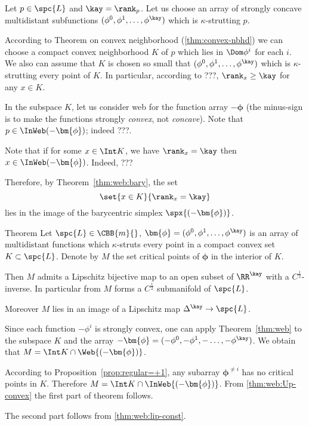 Let $p\in\spc{L}$ and $\kay=\rank_p$.
Let us choose an array of strongly concave multidistant subfunctions $(\phi^0,\phi^1,\dots,\phi^\kay)$ which is $\kappa$-strutting $p$.

According to Theorem on convex neighborhood (\ref{thm:convex-nbhd}) we can choose a compact convex neighborhood $K$ of $p$
which lies in $\Dom\phi^i$ for each $i$.
We also can assume that $K$ is chosen so small that $(\phi^0,\phi^1,\dots,\phi^\kay)$ which is $\kappa$-strutting every point of $K$.
In particular, according to ???, $\rank_x\ge \kay$ for any $x\in K$. 

In the subspace $K$, 
let us consider web for the function array
$-\bm{\phi}$ (the minus-sign is to make the functions strongly \emph{convex}, not \emph{concave}).
Note that $p\in\InWeb(-\bm{\phi})$;
indeed ???.

Note that if for some $x\in\Int K$, 
we have $\rank_x=\kay$ 
then $x\in\InWeb (-\bm{\phi})$.
Indeed, ???

Therefore, by Theorem~\ref{thm:web:bary},
the set 
$$\set{x\in K}{\rank_x=\kay}$$
lies in the image of the barycentric simplex $\spx{(-\bm{\phi})}$.

\begin{thm}{Theorem}
Let $\spc{L}\in\CBB{m}{}$,
$\bm{\phi}=(\phi^0,\phi^1,\dots,\phi^\kay)$ 
is an array of multidistant functions which 
$\kappa$-struts every point in a compact convex set $K\subset  \spc{L}$.
Denote by $M$ the set critical points of $\bm{\phi}$ in the interior of $K$.

Then $M$
admits a Lipschitz bijective map to an open subset of $\RR^\kay$ with a $C^{\frac12}$-inverse.
In particular from $M$ forms a $C^{\frac12}$ submanifold of $\spc{L}$.

Moreover $M$ lies in an image of a Lipschitz map $\Delta^\kay\to \spc{L}$.
\end{thm}

Since each function $-\phi^i$ is strongly convex,
one can apply Theorem~\ref{thm:web} to the
subspace $K$
and the array $-\bm{\phi}=(-\phi^0,-\phi^1,-\dots,-\phi^\kay)$.
We obtain that $M=\Int K\cap \Web{(-\bm{\phi})}$.

According to Proposition~\ref{prop:regular=+1}, 
any subarray $\bm{\phi}^{\ne i}$
has no critical points in $K$.
Therefore $M=\Int K\cap\InWeb{(-\bm{\phi})}$.
From \ref{thm:web:Up-convex} the first part of theorem follows.

The second part follows from \ref{thm:web:lip-const}.
\qeds



